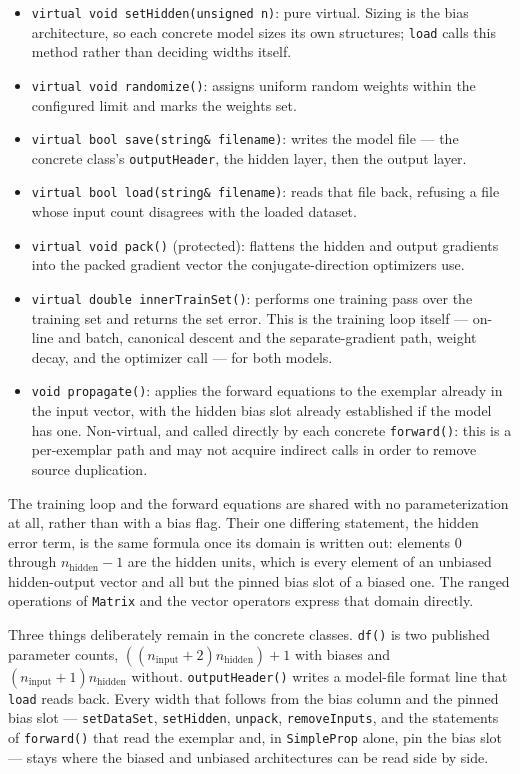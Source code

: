 \begin{itemize}
\item \texttt{virtual void setHidden(unsigned n)}: pure virtual.  Sizing is the
      bias architecture, so each concrete model sizes its own structures;
      \texttt{load} calls this method rather than deciding widths itself.
\item \texttt{virtual void randomize()}: assigns uniform random weights within
      the configured limit and marks the weights set.
\item \texttt{virtual bool save(string\& filename)}: writes the model file ---
      the concrete class's \texttt{outputHeader}, the hidden layer, then the
      output layer.
\item \texttt{virtual bool load(string\& filename)}: reads that file back,
      refusing a file whose input count disagrees with the loaded dataset.
\item \texttt{virtual void pack()} (protected): flattens the hidden and output gradients
      into the packed gradient vector the conjugate-direction optimizers use.
\item \texttt{virtual double innerTrainSet()}: performs one training pass over
      the training set and returns the set error.  This is the training loop
      itself --- on-line and batch, canonical descent and the separate-gradient
      path, weight decay, and the optimizer call --- for both models.
\item \texttt{void propagate()}: applies the forward equations to the exemplar
      already in the input vector, with the hidden bias slot already
      established if the model has one.  Non-virtual, and called directly by
      each concrete \texttt{forward()}: this is a per-exemplar path and may not
      acquire indirect calls in order to remove source duplication.
\end{itemize}

The training loop and the forward equations are shared with no
parameterization at all, rather than with a bias flag.  Their one differing
statement, the hidden error term, is the same formula once its domain is
written out: elements $0$ through $n_{\mathrm{hidden}}-1$ are the hidden units,
which is every element of an unbiased hidden-output vector and all but the
pinned bias slot of a biased one.  The ranged operations of \texttt{Matrix} and
the vector operators express that domain directly.

Three things deliberately remain in the concrete classes.  \texttt{df()} is
two published parameter counts, $((n_{\mathrm{input}}+2)n_{\mathrm{hidden}})+1$
with biases and $(n_{\mathrm{input}}+1)n_{\mathrm{hidden}}$ without.
\texttt{outputHeader()} writes a model-file format line that \texttt{load}
reads back.  Every width that follows from the bias column and the pinned bias
slot --- \texttt{setDataSet}, \texttt{setHidden}, \texttt{unpack},
\texttt{removeInputs}, and the statements of \texttt{forward()} that read the
exemplar and, in \texttt{SimpleProp} alone, pin the bias slot --- stays where
the biased and unbiased architectures can be read side by side.

